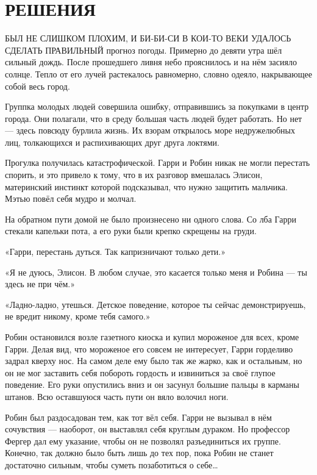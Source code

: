\documentclass[a4paper,12pt]{book}
\begin{document}
\chapter{РЕШЕНИЯ}
\noindent{} БЫЛ НЕ СЛИШКОМ ПЛОХИМ, И БИ-БИ-СИ В КОИ-ТО ВЕКИ УДАЛОСЬ СДЕЛАТЬ ПРАВИЛЬНЫЙ прогноз погоды. Примерно до девяти утра шёл сильный дождь. После прошедшего ливня небо прояснилось и на нём засияло солнце. Тепло от его лучей растекалось равномерно, словно одеяло, накрывающее собой весь город.
\par
Группка молодых людей совершила ошибку, отправившись за покупками в центр города. Они полагали, что в среду большая часть людей будет работать. Но нет — здесь повсюду бурлила жизнь. Их взорам открылось море недружелюбных лиц, толкающихся и распихивающих друг друга локтями.\\
\par
Прогулка получилась катастрофической. Гарри и Робин никак не могли перестать спорить, и это привело к тому, что в их разговор вмешалась Элисон, материнский инстинкт которой подсказывал, что нужно защитить мальчика. Мэтью повёл себя мудро и молчал.
\par
На обратном пути домой не было произнесено ни одного слова. Со лба Гарри стекали капельки пота, а его руки были крепко скрещены на груди.
\par
«Гарри, перестань дуться. Так капризничают только дети.»
\par
«Я не дуюсь, Элисон. В любом случае, это касается только меня и Робина — ты здесь не при чём.»
\par
«Ладно-ладно, утешься. Детское поведение, которое ты сейчас демонстрируешь, не вредит никому, кроме тебя самого.»
\par
Робин остановился возле газетного киоска и купил мороженое для всех, кроме Гарри. Делая вид, что мороженое его совсем не интересует, Гарри горделиво задрал кверху нос. На самом деле ему было так же жарко, как и остальным, но он не мог заставить себя побороть гордость и извиниться за своё глупое поведение. Его руки опустились вниз и он засунул большие пальцы в карманы штанов. Всю оставшуюся часть пути он вяло волочил ноги.
\par
Робин был раздосадован тем, как тот вёл себя. Гарри не вызывал в нём сочувствия — наоборот, он выставлял себя круглым дураком. Но профессор Фергер дал ему указание, чтобы он не позволял разъединиться их группе. Конечно, так должно было быть лишь до тех пор, пока Робин не станет достаточно сильным, чтобы суметь позаботиться о себе…\\
\end{document}

